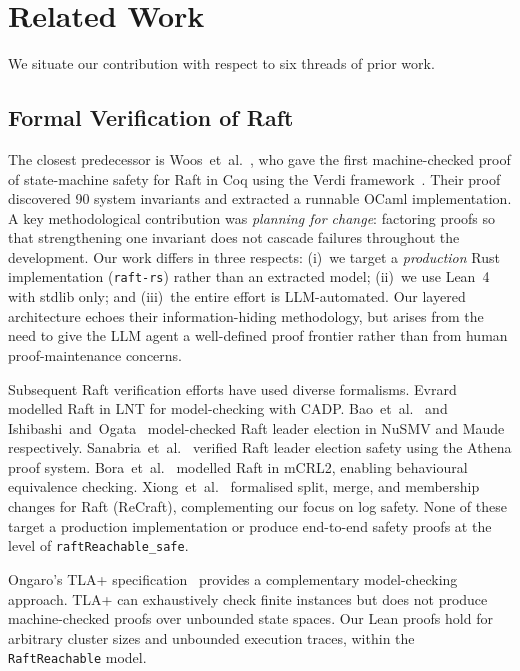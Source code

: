 \documentclass[sigconf,10pt]{acmart}
\begin{document}
\section{Related Work}
\label{sec:related}

We situate our contribution with respect to six threads of prior work.

\subsection{Formal Verification of Raft}

The closest predecessor is Woos~et~al.~\cite{vard}, who gave the first
machine-checked proof of state-machine safety for Raft in Coq using the
Verdi framework~\cite{verdi}.  Their proof discovered 90 system invariants
and extracted a runnable OCaml implementation.  A key methodological
contribution was \emph{planning for change}: factoring proofs so that
strengthening one invariant does not cascade failures throughout the
development.  Our work differs in three respects: (i)~we target a
\emph{production} Rust implementation (\texttt{raft-rs}) rather than an
extracted model; (ii)~we use Lean~4 with stdlib only; and (iii)~the
entire effort is LLM-automated.  Our layered architecture echoes
their information-hiding methodology, but arises from the need to give
the LLM agent a well-defined proof frontier rather than from human
proof-maintenance concerns.

Subsequent Raft verification efforts have used diverse formalisms.
Evrard~\cite{evrard2020raft} modelled Raft in LNT for model-checking
with CADP.  Bao~et~al.~\cite{bao2022raft} and
Ishibashi~and~Ogata~\cite{ishibashi2023raft} model-checked Raft leader
election in NuSMV and Maude respectively.
Sanabria~et~al.~\cite{sanabria2024raft} verified Raft leader election
safety using the Athena proof system.
Bora~et~al.~\cite{bora2024raft} modelled Raft in mCRL2, enabling
behavioural equivalence checking.
Xiong~et~al.~\cite{xiong2025recraft} formalised split, merge, and
membership changes for Raft (ReCraft), complementing our focus on
log safety.  None of these target a production implementation or
produce end-to-end safety proofs at the level of
\texttt{raftReachable\_safe}.

Ongaro's TLA+ specification~\cite{ongaro2014dissertation} provides
a complementary model-checking approach.  TLA+
can exhaustively check finite instances but does not produce
machine-checked proofs over unbounded state spaces.  Our Lean proofs
hold for arbitrary cluster sizes and unbounded execution traces,
within the \texttt{RaftReachable} model.
\end{document}
